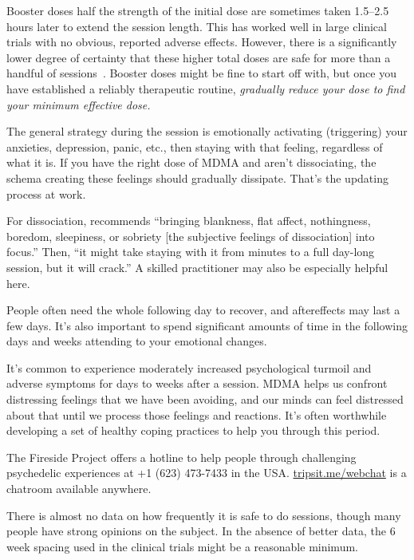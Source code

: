 \documentclass[11pt,oneside]{book}
\newcommand{\mdcite}[1]{}
\begin{document}
Booster doses half the strength of the initial dose are sometimes taken 1.5--2.5\,hours later to extend the session length. This has worked well in large clinical trials with no obvious, reported adverse effects. However, there is a significantly lower degree of certainty that these higher total doses are safe for more than a handful of sessions~\mdcite{baggottSupplements}. Booster doses might be fine to start off with, but once you have established a reliably therapeutic routine, \textit{gradually reduce your dose to find your minimum effective dose.}

The general strategy during the session is emotionally activating (triggering) your anxieties, depression, panic, etc., then staying with that feeling, regardless of what it is. If you have the right dose of MDMA and aren't dissociating, the schema creating these feelings should gradually dissipate. That's the updating process at work.

For dissociation, \textcite[p. 14]{razviPSIP} recommends \enquote{bringing blankness, flat affect, nothingness, boredom, sleepiness, or sobriety [the subjective feelings of dissociation] into focus.} Then, \enquote{it might take staying with it from minutes to a full day-long session, but it will crack.} A skilled practitioner may also be especially helpful here.

People often need the whole following day to recover, and aftereffects may last a few days. It's also important to spend significant amounts of time in the following days and weeks attending to your emotional changes.

It's common to experience moderately increased psychological turmoil and adverse symptoms for days to weeks after a session. MDMA helps us confront distressing feelings that we have been avoiding, and our minds can feel distressed about that until we process those feelings and reactions. It's often worthwhile developing a set of healthy coping practices to help you through this period.

The Fireside Project offers a hotline to help people through challenging psychedelic experiences at +1 (623) 473-7433 in the USA. \href{https://tripsit.me/webchat}{tripsit.me/webchat} is a chatroom available anywhere.

There is almost no data on how frequently it is safe to do sessions, though many people have strong opinions on the subject. In the absence of better data, the 6\,week spacing used in the clinical trials might be a reasonable minimum.
\end{document}
